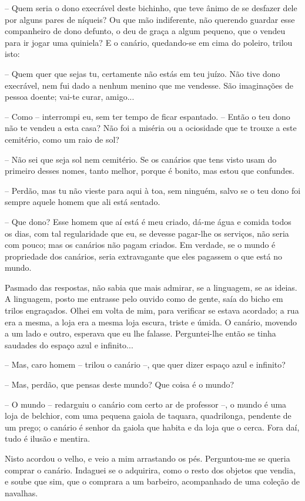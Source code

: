 -- Quem seria o dono execrável deste bichinho, que teve ânimo de se
desfazer dele por alguns pares de níqueis? Ou que mão indiferente, não
querendo guardar esse companheiro de dono defunto, o deu de graça a
algum pequeno, que o vendeu para ir jogar uma quiniela? E o canário,
quedando-se em cima do poleiro, trilou isto:

-- Quem quer que sejas tu, certamente não estás em teu juízo. Não tive
dono execrável, nem fui dado a nenhum menino que me vendesse. São
imaginações de pessoa doente; vai-te curar, amigo...

-- Como -- interrompi eu, sem ter tempo de ficar espantado. -- Então o
teu dono não te vendeu a esta casa? Não foi a miséria ou a ociosidade
que te trouxe a este cemitério, como um raio de sol?

-- Não sei que seja sol nem cemitério. Se os canários que tens visto
usam do primeiro desses nomes, tanto melhor, porque é bonito, mas estou
que confundes.

-- Perdão, mas tu não vieste para aqui à toa, sem ninguém, salvo se o
teu dono foi sempre aquele homem que ali está sentado.

-- Que dono? Esse homem que aí está é meu criado, dá-me água e comida
todos os dias, com tal regularidade que eu, se devesse pagar-lhe os
serviços, não seria com pouco; mas os canários não pagam criados. Em
verdade, se o mundo é propriedade dos canários, seria extravagante que
eles pagassem o que está no mundo.

Pasmado das respostas, não sabia que mais admirar, se a linguagem, se as
ideias. A linguagem, posto me entrasse pelo ouvido como de gente, saía
do bicho em trilos engraçados. Olhei em volta de mim, para verificar se
estava acordado; a rua era a mesma, a loja era a mesma loja escura,
triste e úmida. O canário, movendo a um lado e outro, esperava que eu
lhe falasse. Perguntei-lhe então se tinha saudades do espaço azul e
infinito...

-- Mas, caro homem -- trilou o canário --, que quer dizer espaço azul e
infinito?

-- Mas, perdão, que pensas deste mundo? Que coisa é o mundo?

-- O mundo -- redarguiu o canário com certo ar de professor --, o mundo
é uma loja de belchior, com uma pequena gaiola de taquara, quadrilonga,
pendente de um prego; o canário é senhor da gaiola que habita e da loja
que o cerca. Fora daí, tudo é ilusão e mentira.

Nisto acordou o velho, e veio a mim arrastando os pés. Perguntou-me se
queria comprar o canário. Indaguei se o adquirira, como o resto dos
objetos que vendia, e soube que sim, que o comprara a um barbeiro,
acompanhado de uma coleção de navalhas.

